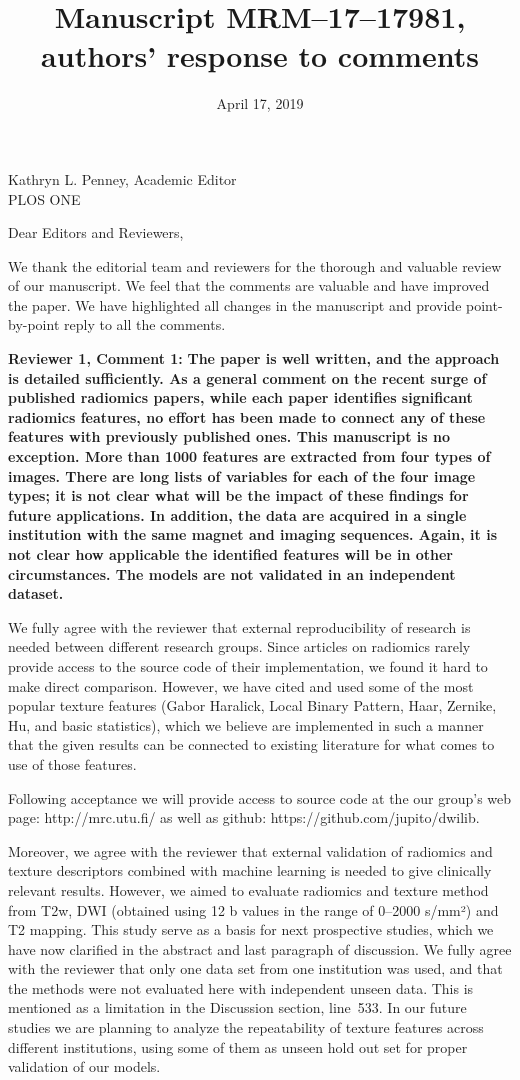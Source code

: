 \documentclass{letter}
\title{Manuscript MRM--17--17981, authors' response to comments}
\date{April 17, 2019}
\newenvironment{comment}[1]%
  {\vspace{5ex}\par\textbf{#1:}\ignorespaces\bfseries}%
  {\par\ignorespacesafterend}
\newenvironment{reply}%
  {\vspace{2ex}\par}%
  {\par\upshape}
\begin{document}
\begin{letter}{Kathryn L. Penney, Academic Editor \\ PLOS ONE}
\opening{Dear Editors and Reviewers,}

We thank the editorial team and reviewers for the thorough and valuable review of our manuscript. We feel that the comments are valuable and have improved the paper. We have highlighted all changes in the manuscript and provide point-by-point reply to all the comments. 


\begin{comment}{Reviewer 1, Comment 1}
The paper is well written, and the approach is detailed sufficiently. As a
general comment on the recent surge of published radiomics papers, while each
paper identifies significant radiomics features, no effort has been made to
connect any of these features with previously published ones. This manuscript is no exception. More than 1000 features are extracted from four types of images. There are long lists of variables for each of the four image types; it is not clear what will be the impact of these findings for future applications. In addition, the data are acquired in a single institution with the same magnet and imaging sequences. Again, it is not clear how applicable the identified features will be in other circumstances. The models are not validated in an independent dataset.
\end{comment}

\begin{reply}
We fully agree with the reviewer that external reproducibility of research is needed between different research groups. Since articles on radiomics rarely provide access to the source code of their implementation, we found it hard to make direct comparison. However, we have cited and used some of the most popular texture features (Gabor Haralick, Local Binary Pattern, Haar, Zernike, Hu, and basic statistics), which we believe are implemented in such a manner that the given results can be connected to existing literature for what comes to use of those features.

Following acceptance we will provide access to source code at the our group's web page:
http://mrc.utu.fi/ as well as github: https://github.com/jupito/dwilib.

Moreover, we agree with the reviewer that external validation of radiomics and texture descriptors combined with machine learning is needed to give clinically relevant results. However, we aimed to evaluate radiomics and texture method from T2w, DWI (obtained using 12 b values in the range of 0–2000 s/mm²) and T2 mapping. This study serve as a basis for next prospective studies, which we have now clarified in the abstract and last paragraph of discussion. We fully agree with the reviewer that only one data set from one institution was used, and that the methods were not evaluated here with independent unseen data. This is mentioned as a limitation in the Discussion section, line~533. In our future studies we are planning to analyze the repeatability of texture features across different institutions, using some of them as unseen hold out set for proper validation of our models. 


\end{reply}
\end{letter}
\end{document}
